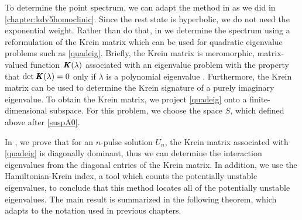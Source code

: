 \documentclass[thesis.tex]{subfiles}
\begin{document}
To determine the point spectrum, we can adapt the method in \cite{Sandstede1998} as we did in \cref{chapter:kdv5homoclinic}. Since the rest state is hyperbolic, we do not need the exponential weight. Rather than do that, in \cite{kapitula2019} we determine the spectrum using a reformulation of the Krein matrix which can be used for quadratic eigenvalue problems such as \cref{quadeig}.  Briefly, the Krein matrix is meromorphic, matrix-valued function $\bm{\mathit{K}}(\lambda)$ associated with an eigenvalue problem with the property that $\mathop\mathrm{det}\nolimits\bm{\mathit{K}}(\lambda)=0$ only if $\lambda$ is a polynomial eigenvalue \cite[Theorem 3.1]{kapitula2019}. Furthermore, the Krein matrix can be used to determine the Krein signature of a purely imaginary eigenvalue. To obtain the Krein matrix, we project \cref{quadeig} onto a finite-dimensional subspace. For this problem, we choose the space $S$, which defined above after \cref{suspA0}.

In \cite[Theorem 6.8]{kapitula2019}, we prove that for an $n$-pulse solution $U_n$, the Krein matrix associated with \cref{quadeig} is diagonally dominant, thus we can determine the interaction eigenvalues from the diagonal entries of the Krein matrix. In addition, we use the Hamiltonian-Krein index, a tool which counts the potentially unstable eigenvalues, to conclude that this method locates all of the potentially unstable eigenvalues. The main result is summarized in the following theorem, which adapts \cite[Corollary 6.9]{kapitula2019} to the notation used in previous chapters.
\end{document}
